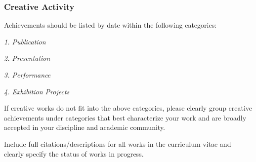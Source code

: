 
\subsubsection*{Creative Activity}

Achievements should be listed by date within the following categories:

\textit{1. Publication}

\textit{2. Presentation}

\textit{3. Performance}

\textit{4. Exhibition Projects}

If creative works do not fit into the above categories, please clearly group creative achievements under categories that best characterize your work and are broadly accepted in your discipline and academic community.

Include full citations/descriptions for all works in the curriculum vitae and clearly specify the status of works in progress.
